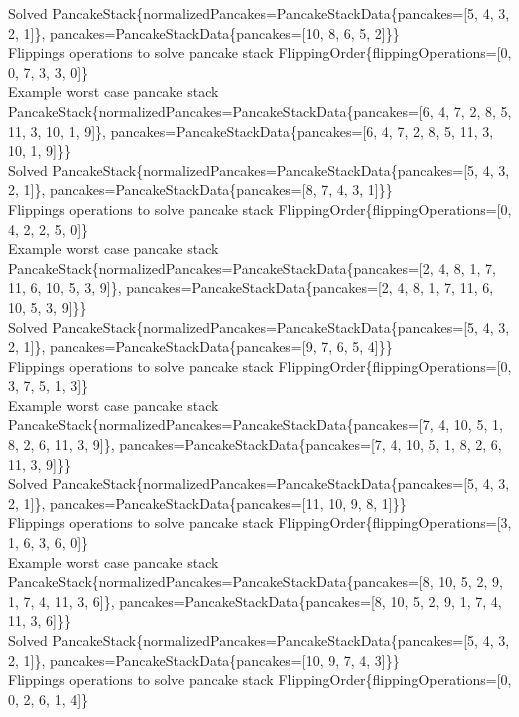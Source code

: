 Solved PancakeStack\{normalizedPancakes=PancakeStackData\{pancakes=[5, 4, 3, 2, 1]\}, pancakes=PancakeStackData\{pancakes=[10, 8, 6, 5, 2]\}\} \\
Flippings operations to solve pancake stack FlippingOrder\{flippingOperations=[0, 0, 7, 3, 3, 0]\} \\
Example worst case pancake stack PancakeStack\{normalizedPancakes=PancakeStackData\{pancakes=[6, 4, 7, 2, 8, 5, 11, 3, 10, 1, 9]\}, pancakes=PancakeStackData\{pancakes=[6, 4, 7, 2, 8, 5, 11, 3, 10, 1, 9]\}\} \\
Solved PancakeStack\{normalizedPancakes=PancakeStackData\{pancakes=[5, 4, 3, 2, 1]\}, pancakes=PancakeStackData\{pancakes=[8, 7, 4, 3, 1]\}\} \\
Flippings operations to solve pancake stack FlippingOrder\{flippingOperations=[0, 4, 2, 2, 5, 0]\} \\
Example worst case pancake stack PancakeStack\{normalizedPancakes=PancakeStackData\{pancakes=[2, 4, 8, 1, 7, 11, 6, 10, 5, 3, 9]\}, pancakes=PancakeStackData\{pancakes=[2, 4, 8, 1, 7, 11, 6, 10, 5, 3, 9]\}\} \\
Solved PancakeStack\{normalizedPancakes=PancakeStackData\{pancakes=[5, 4, 3, 2, 1]\}, pancakes=PancakeStackData\{pancakes=[9, 7, 6, 5, 4]\}\} \\
Flippings operations to solve pancake stack FlippingOrder\{flippingOperations=[0, 3, 7, 5, 1, 3]\} \\
Example worst case pancake stack PancakeStack\{normalizedPancakes=PancakeStackData\{pancakes=[7, 4, 10, 5, 1, 8, 2, 6, 11, 3, 9]\}, pancakes=PancakeStackData\{pancakes=[7, 4, 10, 5, 1, 8, 2, 6, 11, 3, 9]\}\} \\
Solved PancakeStack\{normalizedPancakes=PancakeStackData\{pancakes=[5, 4, 3, 2, 1]\}, pancakes=PancakeStackData\{pancakes=[11, 10, 9, 8, 1]\}\} \\
Flippings operations to solve pancake stack FlippingOrder\{flippingOperations=[3, 1, 6, 3, 6, 0]\} \\
Example worst case pancake stack PancakeStack\{normalizedPancakes=PancakeStackData\{pancakes=[8, 10, 5, 2, 9, 1, 7, 4, 11, 3, 6]\}, pancakes=PancakeStackData\{pancakes=[8, 10, 5, 2, 9, 1, 7, 4, 11, 3, 6]\}\} \\
Solved PancakeStack\{normalizedPancakes=PancakeStackData\{pancakes=[5, 4, 3, 2, 1]\}, pancakes=PancakeStackData\{pancakes=[10, 9, 7, 4, 3]\}\} \\
Flippings operations to solve pancake stack FlippingOrder\{flippingOperations=[0, 0, 2, 6, 1, 4]\} \\
